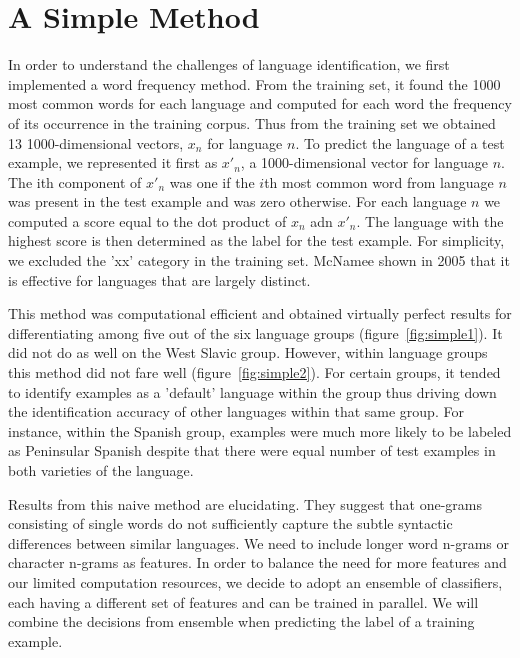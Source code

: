 \documentclass{article}
\begin{document}
\section{A Simple Method}
In order to understand the challenges of language identification, we first implemented a word frequency method. From the training set, it found the 1000 most common words for each language and computed for each word the frequency of its occurrence in the training corpus. Thus from the training set we obtained 13 1000-dimensional vectors, $x_{n}$ for language $n$. To predict the language of a test example, we represented it first as $x'_{n}$, a 1000-dimensional vector for language $n$. The ith component of $x'_n$ was one if the $i$th most common word from language $n$ was present in the test example and was zero otherwise. For each language $n$ we computed a score equal to the dot product of $x_n$ adn $x'_n$. The language with the highest score is then determined as the label for the test example. For simplicity, we excluded the 'xx' category in the training set. McNamee shown in 2005 that it is effective for languages that are largely distinct.

This method was computational efficient and obtained virtually perfect results for differentiating among five out of the six language groups (figure~\ref{fig:simple1}). It did not do as well on the West Slavic group. However, within language groups this method did not fare well (figure~\ref{fig:simple2}). For certain groups, it tended to identify examples as a 'default' language within the group thus driving down the identification accuracy of other languages within that same group. For instance, within the Spanish group, examples were much more likely to be labeled as Peninsular Spanish despite that there were equal number of test examples in both varieties of the language.

Results from this naive method are elucidating. They suggest that one-grams consisting of single words do not sufficiently capture the subtle syntactic differences between similar languages. We need to include longer word n-grams or character n-grams as features. In order to balance the need for more features and our limited computation resources, we decide to adopt an ensemble of classifiers, each having a different set of features and can be trained in parallel. We will combine the decisions from ensemble when predicting the label of a training example.
\end{document}
